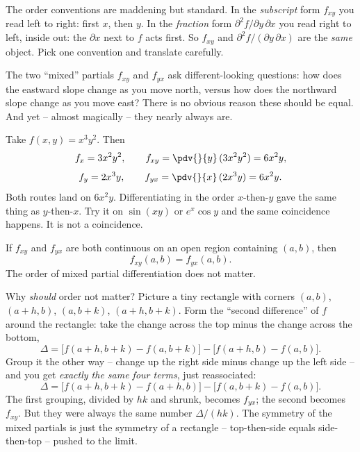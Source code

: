 \begin{trapbox}
The order conventions are maddening but standard. In the \emph{subscript} form $f_{xy}$ you
read left to right: first $x$, then $y$. In the \emph{fraction} form
$\partial^2 f/\partial y\,\partial x$ you read right to left, inside out: the $\partial x$ next
to $f$ acts first. So $f_{xy}$ and $\partial^2 f/(\partial y\,\partial x)$ are the \emph{same}
object. Pick one convention and translate carefully.
\end{trapbox}

The two ``mixed'' partials $f_{xy}$ and $f_{yx}$ ask different-looking questions: how does
the eastward slope change as you move north, versus how does the northward slope change as you
move east? There is no obvious reason these should be equal. And yet -- almost magically --
they nearly always are.

\begin{example}
\label{ch32:ex-mixed}
Take $f(x,y)=x^3 y^2$. Then
\[
   f_x = 3x^2 y^2, \qquad f_{xy} = \pdv{}{y}\,(3x^2 y^2) = 6x^2 y,
\]
\[
   f_y = 2x^3 y, \qquad f_{yx} = \pdv{}{x}\,(2x^3 y) = 6x^2 y.
\]
Both routes land on $6x^2 y$. Differentiating in the order $x$-then-$y$ gave the same thing as
$y$-then-$x$. Try it on $\sin(xy)$ or $e^{x}\cos y$ and the same coincidence happens. It is not
a coincidence.
\end{example}

\begin{theorem}
\label{ch32:thm-clairaut}
If $f_{xy}$ and $f_{yx}$ are both continuous on an open region containing $(a,b)$, then
\[
   f_{xy}(a,b) = f_{yx}(a,b).
\]
The order of mixed partial differentiation does not matter.
\end{theorem}

\begin{intuitionbox}
Why \emph{should} order not matter? Picture a tiny rectangle with corners $(a,b)$,
$(a+h,b)$, $(a,b+k)$, $(a+h,b+k)$. Form the ``second difference'' of $f$ around the rectangle:
take the change across the top minus the change across the bottom,
\[
   \Delta = \big[f(a+h,b+k)-f(a,b+k)\big] - \big[f(a+h,b)-f(a,b)\big].
\]
Group it the other way -- change up the right side minus change up the left side -- and you get
\emph{exactly the same four terms}, just reassociated:
\[
   \Delta = \big[f(a+h,b+k)-f(a+h,b)\big] - \big[f(a,b+k)-f(a,b)\big].
\]
The first grouping, divided by $hk$ and shrunk, becomes $f_{yx}$; the second becomes $f_{xy}$.
But they were always the same number $\Delta/(hk)$. The symmetry of the mixed partials is just
the symmetry of a rectangle -- top-then-side equals side-then-top -- pushed to the limit.
\end{intuitionbox}

